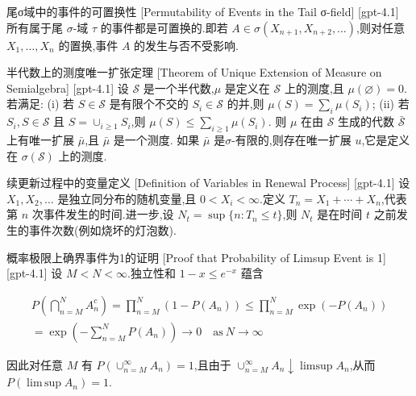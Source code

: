 \documentclass[UTF8]{ctexart}
\begin{document}
    
    
    \begin{ppt}
        {尾σ域中的事件的可置换性}
        [Permutability of Events in the Tail σ-field]
        [gpt-4.1]
        所有属于尾 $\sigma$-域 $\tau$ 的事件都是可置换的.即若 $A \in \sigma(X_{n+1}, X_{n+2}, \ldots)$,则对任意 $X_{1}, \ldots, X_{n}$ 的置换,事件 $A$ 的发生与否不受影响.
    \end{ppt}
    
    
    
    \begin{thm}
        {半代数上的测度唯一扩张定理}
        [Theorem of Unique Extension of Measure on Semialgebra]
        [gpt-4.1]
        设 $\mathcal{S}$ 是一个半代数,$\mu$ 是定义在 $\mathcal{S}$ 上的测度,且 $\mu(\varnothing) = 0$.
若满足:
(i) 若 $S \in \mathcal{S}$ 是有限个不交的 $S_i \in \mathcal{S}$ 的并,则 $\mu(S) = \sum_i \mu(S_i)$;
(ii) 若 $S_i, S \in \mathcal{S}$ 且 $S = \cup_{i \geq 1} S_i$,则 $\mu(S) \leq \sum_{i \geq 1} \mu(S_i)$.
则 $\mu$ 在由 $\mathcal{S}$ 生成的代数 $\bar{\mathcal{S}}$ 上有唯一扩展 $\bar{\mu}$,且 $\bar{\mu}$ 是一个测度.
如果 $\bar{\mu}$ 是$\sigma$-有限的,则存在唯一扩展 $
u$,它是定义在 $\sigma(\mathcal{S})$ 上的测度.

    \end{thm}
    
    
    
    \begin{dfn}
        {续更新过程中的变量定义}
        [Definition of Variables in Renewal Process]
        [gpt-4.1]
        设 $X_{1}, X_{2}, \dots$ 是独立同分布的随机变量,且 $0 < X_{i} < \infty$.定义 $T_{n} = X_{1} + \cdots + X_{n}$,代表第 $n$ 次事件发生的时间.进一步,设 $N_{t} = \sup \{ n : T_{n} \leq t \}$,则 $N_{t}$ 是在时间 $t$ 之前发生的事件次数(例如烧坏的灯泡数).
    \end{dfn}
    
    
    
    \begin{prf}
        {概率极限上确界事件为1的证明}
        [Proof that Probability of Limsup Event is 1]
        [gpt-4.1]
        设 $M < N < \infty$.独立性和 $1 - x \leq e^{-x}$ 蕴含

\[
\begin{array}{r}
P \left( \bigcap_{n=M}^N A_n^c \right) = \prod_{n=M}^N \left( 1 - P ( A_n ) \right) \leq \prod_{n=M}^N \exp ( - P ( A_n ) ) \\
= \exp \left( - \sum_{n=M}^N P ( A_n ) \right) \to 0 \quad \mathrm{as}\ N \to \infty
\end{array}
\]

因此对任意 $M$ 有 $P ( \cup_{n=M}^{\infty} A_n ) = 1$,且由于 $\cup_{n=M}^{\infty} A_n \downarrow \limsup A_n$,从而 $P ( \operatorname*{lim\,sup} A_n ) = 1$.

    \end{prf}
    
\end{document}

